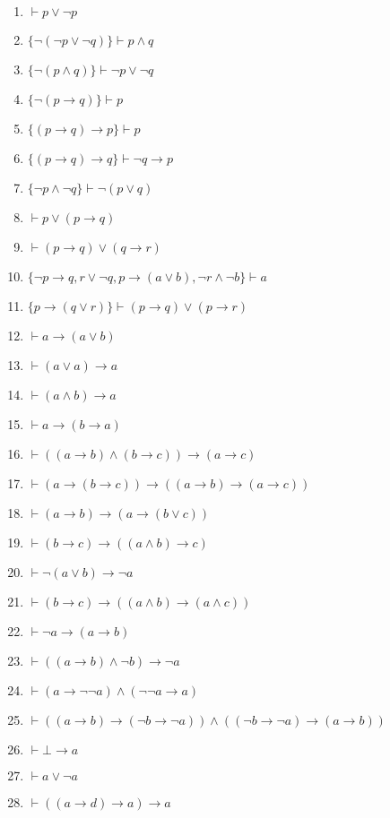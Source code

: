 \begin{enumerate}
    \item \(\vdash p \lor \lnot p\)
    \item \(\{\lnot(\lnot p \lor \lnot q)\} \vdash p \land q\)
    \item \(\{\lnot(p \land q)\} \vdash \lnot p \lor \lnot q\)
    \item \(\{\lnot(p \to q)\} \vdash p\)
    \item \(\{(p \to q) \to p\} \vdash p\)
    \item \(\{(p \to q) \to q\} \vdash \lnot q \to p\)
    \item \(\{\lnot p \land \lnot q\} \vdash \lnot(p \lor q)\)
    \item \(\vdash p \lor (p \to q)\)
    \item \(\vdash (p \to q) \lor (q \to r)\)
    \item \(\{\lnot p \to q, r \lor \lnot q, p \to (a \lor b), \lnot r \land \lnot b\} \vdash a\)
    \item \(\{p \to (q \lor r)\} \vdash (p \to q) \lor (p \to r)\)
    \item \(\vdash a \to (a \lor b)\)
    \item \(\vdash (a \lor a) \to a\)
    \item \(\vdash (a \land b) \to a\)
    \item \(\vdash a \to (b \to a)\)
    \item \(\vdash ((a \to b) \land (b \to c)) \to (a \to c)\)
    \item \(\vdash (a \to (b \to c)) \to ((a \to b) \to (a \to c))\)
    \item \(\vdash (a \to b) \to (a \to (b \lor c))\)
    \item \(\vdash (b \to c) \to ((a \land b) \to c)\)
    \item \(\vdash \lnot(a \lor b) \to \lnot a\)
    \item \(\vdash (b \to c) \to ((a \land b) \to (a \land c))\)
    \item \(\vdash \lnot a \to (a \to b)\)
    \item \(\vdash ((a \to b) \land \lnot b) \to \lnot a\)
    \item \(\vdash (a \to \lnot \lnot a) \land (\lnot \lnot a \to a)\)
    \item \(\vdash ((a \to b) \to (\lnot b \to \lnot a)) \land ((\lnot b \to \lnot a) \to (a \to b))\)
    \item \(\vdash \bot \to a\)
    \item \(\vdash a \lor \lnot a\)
    \item \(\vdash ((a \to d) \to a) \to a\)

\end{enumerate}
